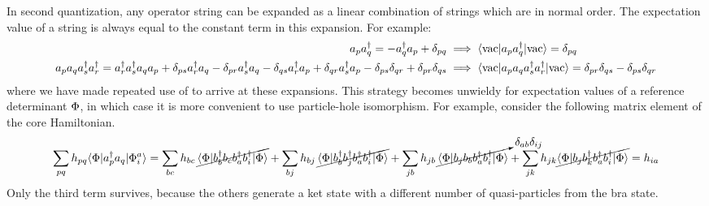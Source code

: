 \documentclass[11pt]{article}
\numberwithin{equation}{section}
\begin{document}
\begin{ex}
In second quantization, any operator string can be expanded as a linear combination of strings which are in normal order.
The expectation value of a string is always equal to the constant term in this expansion.
For example:
\begin{align*}
  a_p a_q^\dagger
=
-
  a_q^\dagger a_p
+
  \delta _{pq}
&\implies
  \langle\mathrm{vac}|a_p a_q^\dagger|\mathrm{vac}\rangle
=
  \delta _{pq}
\\
  a_p a_q a_s^\dagger a_r^\dagger
=
  a_r^\dagger a_s^\dagger a_q a_p
+
  \delta _{ps}
  a_r^\dagger a_q
-
  \delta _{pr}
  a_s^\dagger a_q
-
  \delta _{qs}
  a_r^\dagger a_p
+
  \delta _{qr}
  a_s^\dagger a_p
-
  \delta _{ps}\delta _{qr}
+
  \delta _{pr}\delta _{qs}
&\implies
  \langle\mathrm{vac}|a_p a_q a_s^\dagger a_r^\dagger|\mathrm{vac}\rangle
=
  \delta _{pr}\delta _{qs}
-
  \delta _{ps}\delta _{qr}
\end{align*}
where we have made repeated use of  to arrive at these expansions.
This strategy becomes unwieldy for expectation values of a reference determinant $\Phi $, in which case it is more convenient to use particle-hole isomorphism.
For example, consider the following matrix element of the core Hamiltonian.
\begin{align*}
  \sum_{pq}
  h_{pq}
  \langle\Phi |a_p^\dagger a_q|\Phi _i^a\rangle
=
  \sum_{bc}
  h_{bc}\,
  \cancel{\langle\Phi |b_b^\dagger b_c b_a^\dagger b_i^\dagger|\Phi \rangle}
+
  \sum_{bj}
  h_{bj}\,
  \cancel{\langle\Phi |b_b^\dagger b_j^\dagger b_a^\dagger b_i^\dagger|\Phi \rangle}
+
  \sum_{jb}
  h_{jb}\,
  \cancelto{\delta _{ab}\delta _{ij}}{\langle\Phi |b_j b_b b_a^\dagger b_i^\dagger|\Phi \rangle}
+
  \sum_{jk}
  h_{jk}
  \cancel{\langle\Phi |b_j b_k^\dagger b_a^\dagger b_i^\dagger|\Phi \rangle}
=
  h_{ia}
\end{align*}
Only the third term survives, because the others generate a ket state with a different number of quasi-particles from the bra state.
\end{ex}
\end{document}
